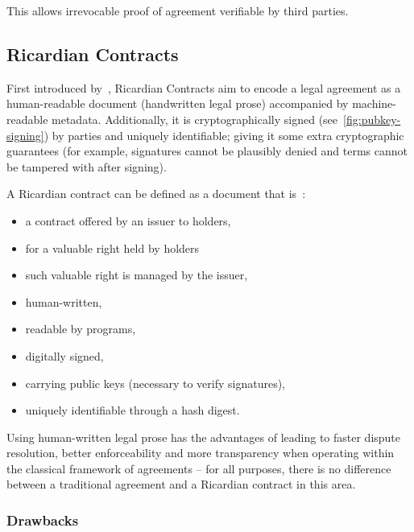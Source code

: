 This allows irrevocable proof of agreement verifiable by third parties.

\subsection{Ricardian Contracts}\label{subsec:ricardian-contracts}

First introduced by~\cite{grigg2004ricardian, ricardianWeb}, Ricardian Contracts aim to encode a legal agreement as a human-readable document (handwritten legal prose) accompanied by machine-readable metadata.
Additionally, it is cryptographically signed (see~\ref{fig:pubkey-signing}) by parties and uniquely identifiable;
giving it some extra cryptographic guarantees (for example, signatures cannot be plausibly denied and terms cannot be tampered with after signing).


\begin{definition}
    \label{def:ricardian}
    A Ricardian contract can be defined as a document that is~\cite[]{grigg2004ricardian}:
    \begin{itemize}
        \item a contract offered by an issuer to holders,
        \item for a valuable right held by holders
        \item such valuable right is managed by the issuer,
        \item human-written,
        \item readable by programs,
        \item digitally signed,
        \item carrying public keys (necessary to verify signatures),
        \item uniquely identifiable through a hash digest.
    \end{itemize}
\end{definition}

Using human-written legal prose has the advantages of leading to faster dispute resolution, better enforceability and more transparency when operating within the classical framework of agreements -- for all purposes, there is no difference between a traditional agreement and a Ricardian contract in this area.\\

\subsubsection{Drawbacks}

